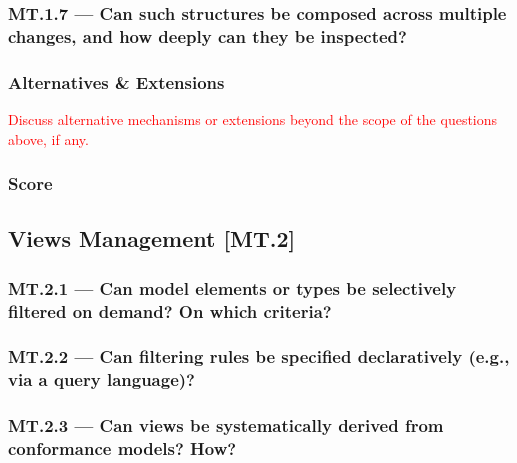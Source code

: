 \documentclass[sigconf,review]{acmart}
\begin{document}


\subsubsection*{MT.1.7 --- Can such structures be composed across multiple changes, and how deeply can they be inspected?}
\label{sec:MT1-7}



\subsubsection*{Alternatives \& Extensions}
\label{sec:MT1-Alternatives-Extensions}

\textcolor{red}{Discuss alternative mechanisms or extensions beyond the 
scope of the questions above, if any.}

\subsubsection*{Score}
\label{sec:MT1-Score}



\subsection{Views Management [MT.2]}
\label{sec:MT2}

\subsubsection*{MT.2.1 --- Can model elements or types be selectively filtered on demand? On which criteria?}
\label{sec:MT2-1}



\subsubsection*{MT.2.2 --- Can filtering rules be specified declaratively (e.g., via a query language)?}
\label{sec:MT2-2}



\subsubsection*{MT.2.3 --- Can views be systematically derived from conformance models? How?}
\label{sec:MT2-3}
\end{document}
